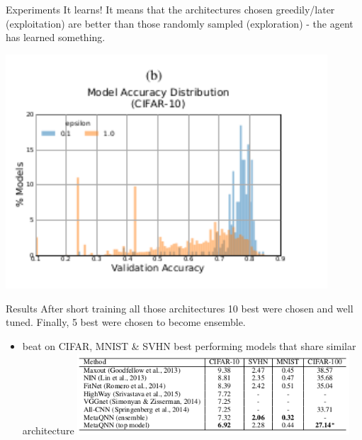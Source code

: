 \documentclass{beamer}
\begin{document}
\begin{frame}{Experiments}
It learns! It means that the architectures chosen greedily/later (exploitation) are better than those randomly sampled (exploration) - the agent has learned something.
\begin{center}
\includegraphics[width=0.9\textwidth]{exp2.png}
\end{center}
\end{frame}

\begin{frame}{Results}
After short training all those architectures 10 best were chosen and well tuned. Finally, 5 best were chosen to become ensemble.
\vskip0.1in
\begin{itemize}
  \item beat on CIFAR, MNIST \& SVHN best performing models that share similar architecture
  \includegraphics[width=0.8\textwidth]{best_on_similar.png}
  \end{itemize}
\end{frame}
\end{document}
